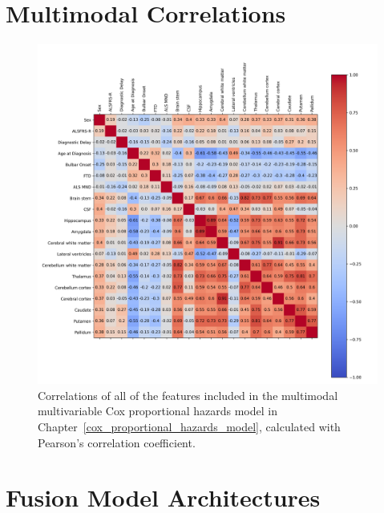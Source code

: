
 \appendix
\chapter{Multimodal Correlations}
\begin{figure}
    \centering
    \includegraphics[width=\textwidth]{figures/multimodal_correlation}
    \caption{Correlations of all of the features included in the multimodal multivariable Cox proportional hazards model in Chapter~\ref{cox_proportional_hazards_model}, calculated with Pearson's correlation coefficient.}
    \label{fig:multimodalcorrelations}
\end{figure}

\chapter{Fusion Model Architectures}
\label{appendix:fusion_model_architectures}

